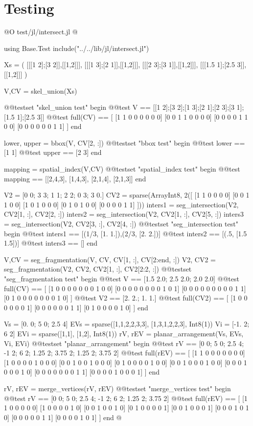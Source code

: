 \documentclass[10pt,oneside]{article}
\begin{document}
\section{Testing}
@O test/jl/intersect.jl
@{using Base.Test
include("../../lib/jl/intersect.jl")

Xs = (
    [[[1 2];[3 2]],[[1,2]]],
    [[[1 3];[2 1]],[[1,2]]],
    [[[2 3];[3 1]],[[1,2]]],
    [[[1.5 1];[2.5 3]],[[1,2]]]
)

V,CV = skel_union(Xs)

@@testset "skel_union test" begin
    @@test V == [[1 2];[3 2];[1 3];[2 1];[2 3];[3 1];[1.5 1];[2.5 3]]
    @@test full(CV) == [
        [1 1 0 0 0 0 0 0]
        [0 0 1 1 0 0 0 0]
        [0 0 0 0 1 1 0 0]
        [0 0 0 0 0 0 1 1]
    ]
end

lower, upper = bbox(V, CV[2, :])
@@testset "bbox test" begin
    @@test lower == [1 1]
    @@test upper == [2 3]
end

mapping = spatial_index(V,CV)
@@testset "spatial_index test" begin
    @@test mapping == [[2,4,3], [1,4,3], [2,1,4], [2,1,3]]
end

V2 = [0 0; 3 3; 1 1; 2 2; 0 3; 3 0.]
CV2 = sparse(Array{Int8, 2}([
    [1 1 0 0 0 0]
    [0 0 1 1 0 0]
    [1 0 1 0 0 0]
    [0 1 0 1 0 0]
    [0 0 0 0 1 1]
]))
inters1 = seg_intersection(V2, CV2[1, :], CV2[2, :])
inters2 = seg_intersection(V2, CV2[1, :], CV2[5, :])
inters3 = seg_intersection(V2, CV2[3, :], CV2[4, :])
@@testset "seg_intersection test" begin
    @@test inters1 == [(1/3, [1. 1.]),(2/3, [2. 2.])]
    @@test inters2 == [(.5, [1.5 1.5])]
    @@test inters3 == []
end

V,CV = seg_fragmentation(V, CV, CV[1, :], CV[2:end, :])
V2, CV2 = seg_fragmentation(V2, CV2, CV2[1, :], CV2[2:2, :])
@@testset "seg_fragmentation test" begin
    @@test V == [1.5 2.0; 2.5 2.0; 2.0 2.0]
    @@test full(CV) == [
        [1 0 0 0 0 0 0 0 1 0 0]
        [0 0 0 0 0 0 0 0 1 0 1]
        [0 0 0 0 0 0 0 0 0 1 1]
        [0 1 0 0 0 0 0 0 0 1 0]
    ]
    @@test V2 == [2. 2.; 1. 1.]
    @@test full(CV2) == [
        [1 0 0 0 0 0 0 1]
        [0 0 0 0 0 0 1 1]
        [0 1 0 0 0 0 1 0]
    ] 
end

Vs = [0. 0; 5 0; 2.5 4]
EVs = sparse([1,1,2,2,3,3], [1,3,1,2,2,3], Int8(1))
Vi = [-1. 2; 6 2]
EVi = sparse([1,1], [1,2], Int8(1))
rV, rEV = planar_arrangement(Vs, EVs, Vi, EVi)
@@testset "planar_arrangement" begin
    @@test rV == [0 0; 5 0; 2.5 4; -1 2; 6 2; 1.25 2; 3.75 2; 1.25 2; 3.75 2]
    @@test full(rEV) == [
        [1 1 0 0 0 0 0 0 0]
        [1 0 0 0 0 1 0 0 0]
        [0 0 1 0 0 1 0 0 0]
        [0 1 0 0 0 0 1 0 0]
        [0 0 1 0 0 0 1 0 0]
        [0 0 0 1 0 0 0 1 0]
        [0 0 0 0 0 0 0 1 1]
        [0 0 0 0 1 0 0 0 1]
    ]
end


rV, rEV = merge_vertices(rV, rEV)
@@testset "merge_vertices test" begin
    @@test rV == [0 0; 5 0; 2.5 4; -1 2; 6 2; 1.25 2; 3.75 2]
    @@test full(rEV) == [
        [1 1 0 0 0 0 0]
        [1 0 0 0 0 1 0]
        [0 0 1 0 0 1 0]
        [0 1 0 0 0 0 1]
        [0 0 1 0 0 0 1]
        [0 0 0 1 0 1 0]
        [0 0 0 0 0 1 1]
        [0 0 0 0 1 0 1]
    ]
end
@}
\end{document}
